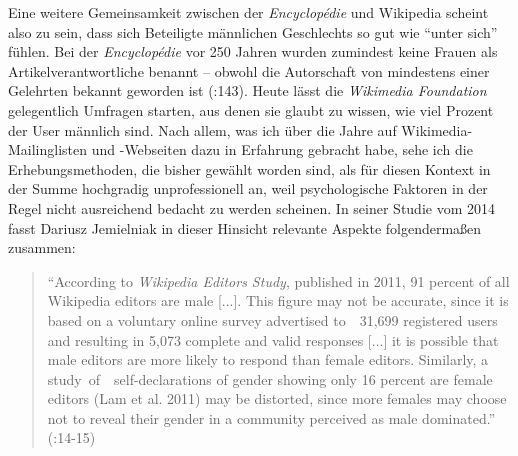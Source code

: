 \documentclass[fontsize=12pt]{scrartcl}
\begin{document}
Eine weitere Gemeinsamkeit zwischen der \textit{Encyclop\'{e}die} und Wi\-ki\-pe\-dia scheint also zu sein, dass sich Beteiligte m\"annlichen Geschlechts so gut wie "`unter sich"' f\"uhlen. Bei der \textit{Encyclop\'{e}die} vor 250 Jahren wurden zumindest keine Frauen als Artikelverantwortliche benannt -- obwohl die Autor\textsuperscript{\tiny *}schaft von mindestens einer Gelehrten bekannt geworden ist (\cite{Blom2004}:143). Heute l\"asst die \textit{Wikimedia Foundation} gelegentlich Umfragen starten, aus denen sie glaubt zu wissen, wie viel Prozent der User m\"annlich sind. Nach allem, was ich \"uber die Jahre auf Wikimedia-Mailing\-listen und -Websei\-ten dazu in Erfah\-rung gebracht habe, sehe ich die Erhebungsmethoden, die bis\-her gew\"ahlt worden sind, als f\"ur diesen Kontext in der Summe hochgradig unprofessionell an, weil psychologische Faktoren in der Regel nicht ausreichend bedacht zu werden scheinen. In seiner Studie vom 2014 fasst Dariusz Jemielniak in dieser Hinsicht relevante Aspekte folgenderma{\ss}en zusammen: 

\singlespacing
\begin{quote}
"`According to \textit{Wi\-ki\-pe\-dia Editors Study}, published in 2011, 91 percent of all Wikipedia editors are male [...]. This figure may not be accurate, since it is based on a voluntary online survey advertised \mbox{to  31,699} registered users and resulting in 5,073 complete and valid responses [...] it is possible that male editors are more likely to respond than female editors. Similarly, a \mbox{study of  self-declarations} of gender showing only 16 percent are female editors (Lam et al. 2011) may be distorted, since more females may choose not to reveal their gender in a community perceived as male dominated."' (\cite{Jemielniak2014}:14-15)
\end{quote} 
\onehalfspacing
\end{document}
